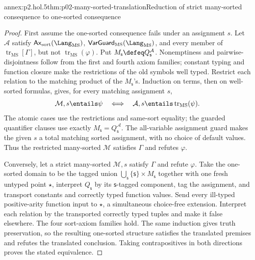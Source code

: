 \begin{annexitem}{annex:p2.hol.5}{thm:p02-many-sorted-translation}{Reduction of strict many-sorted consequence to one-sorted consequence}
\begin{proof}
First assume the one-sorted consequence fails under an assignment \(s\).  Let
\(\mathcal A\) satisfy \(\mathsf{Ax}_{\mathrm{sort}}(\Lang_{\mathrm{MS}})\),
\(\mathsf{VarGuard}_{\mathrm{MS}}(\Lang_{\mathrm{MS}})\), and every member of
\(\operatorname{tr}_{\mathrm{MS}}[\Gamma]\), but not
\(\operatorname{tr}_{\mathrm{MS}}(\varphi)\).  Put
\(M_{\mathsf s}\defeq Q_{\mathsf s}^{\mathcal A}\).  Nonemptiness and pairwise-disjointness
follow from the first and fourth axiom families; constant typing and function
closure make the restrictions of the old symbols well typed.  Restrict each
relation to the matching product of the \(M_{\mathsf s}\)'s.  Induction on terms, then
on well-sorted formulas, gives, for every matching assignment \(s\),
\[
 \mathcal M,s\entails\psi
 \quad\Longleftrightarrow\quad
 \mathcal A,s\entails\operatorname{tr}_{\mathrm{MS}}(\psi).
\]
The atomic cases use the restrictions and same-sort equality; the guarded
quantifier clauses use exactly
\(M_{\mathsf s}=Q_{\mathsf s}^{\mathcal A}\).  The all-variable assignment
guard makes the given \(s\) a total matching sorted assignment, with no choice
of default values.  Thus the restricted many-sorted \(\mathcal M\) satisfies
\(\Gamma\) and refutes \(\varphi\).

Conversely, let a strict many-sorted \(\mathcal M,s\) satisfy \(\Gamma\) and
refute \(\varphi\).  Take the one-sorted domain to be the tagged union
\(\bigcup_{\mathsf s}\{\mathsf s\}\times M_{\mathsf s}\) together with one
fresh untyped point \(\star\), interpret
\(Q_{\mathsf s}\) by its \(\mathsf s\)-tagged
component, tag the assignment, and transport constants and correctly typed
function values.  Send every ill-typed positive-arity function input to
\(\star\), a simultaneous choice-free extension.
Interpret each relation by the transported correctly typed tuples and make it
false elsewhere.  The four sort-axiom families hold.  The same induction gives
truth preservation, so the resulting one-sorted structure satisfies the
translated premises and refutes the translated conclusion.  Taking
contrapositives in both directions proves the stated equivalence.
\end{proof}
\end{annexitem}

